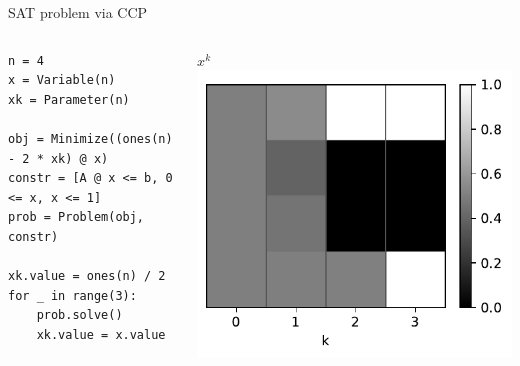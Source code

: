 \documentclass[aspectratio=169,11pt]{beamer}
\begin{document}
\begin{frame}[fragile]{SAT problem via CCP}
\begin{columns}
\begin{column}{0.6\textwidth}
\begin{verbatim}
n = 4
x = Variable(n)
xk = Parameter(n)

obj = Minimize((ones(n) - 2 * xk) @ x)
constr = [A @ x <= b, 0 <= x, x <= 1]
prob = Problem(obj, constr)

xk.value = ones(n) / 2
for _ in range(3):
    prob.solve()
    xk.value = x.value
\end{verbatim}
\end{column}
\begin{column}{0.4\textwidth}
\hspace{60pt} $x^k$
\includegraphics[width=\textwidth]{sat_small.pdf}
\end{column}
\end{columns}
\end{frame}
\end{document}
